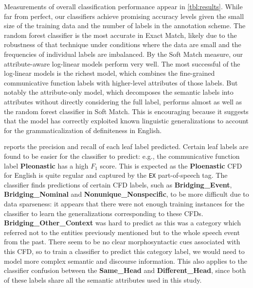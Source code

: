 \documentclass[11pt,letterpaper]{article}
\begin{document}
Measurements of overall classification performance appear in \cref{tbl:results}. While far from perfect, our classifiers achieve promising accuracy levels 
given the small size of the training data and the number of labels in the annotation scheme.
The random forest classifier is the most accurate in Exact Match, likely due to the robustness of that technique under
conditions where the data are small and the frequencies of individual labels are imbalanced. By the Soft Match measure, our attribute-aware log-linear models perform very well. The most successful of the log-linear models is the richest model, which combines the fine-grained 
communicative function labels with higher-level attributes of those labels. But notably the attribute-only model,
which decomposes the semantic labels into attributes without directly considering the full label, 
performs almost as well as the random forest classifier in Soft Match.
This is encouraging because it suggests that the model has correctly exploited known linguistic generalizations 
to account for the grammaticalization of definiteness in English. 

 reports the precision and recall of each leaf label predicted. 
Certain leaf labels are found to be easier for the classifier to predict: 
e.g., the communicative function label {\bf Pleonastic} has a high $F_1$ score. 
This is expected as the {\bf Ploenastic} CFD for English is quite regular and captured by the \texttt{EX} part-of-speech tag. 
The classifier finds predictions of certain CFD labels, 
such as {\bf Bridging\_Event}, {\bf Bridging\_Nominal} and {\bf Nonunique\_Nonspecific}, to be more difficult due to 
data sparseness: it appears that there were not enough training instances for the classifier to learn the generalizations corresponding to these CFDs.  
{\bf Bridging\_Other\_Context} was hard to predict as this was a category which referred not to the entities previously mentioned 
but to the whole speech event from the past. There seem to be no clear morphosyntactic cues associated with this CFD, 
so to train a classifier to predict this category label, we would need to model more complex semantic and discourse information. 
This also applies to the classifier confusion between the {\bf Same\_Head} and {\bf Different\_Head}, 
since both of these labels share all the semantic attributes used in this study.  
\end{document}
